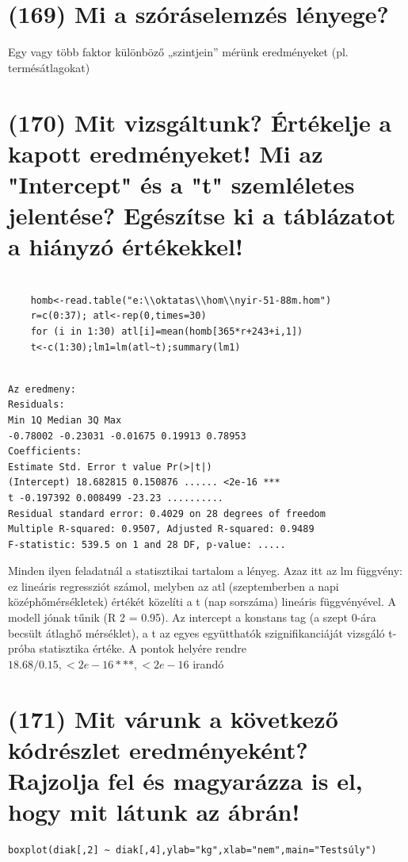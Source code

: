 \documentclass[12p]{article}
\begin{document}
\section{(169) Mi a szóráselemzés lényege?}
Egy vagy több faktor különböző „szintjein” mérünk eredményeket (pl. termésátlagokat)


\section{(170) Mit vizsgáltunk? Értékelje a kapott eredményeket! Mi az "Intercept" és a "t" szemléletes
jelentése? Egészítse ki a táblázatot a hiányzó értékekkel!}

\begin{verbatim}

	homb<-read.table("e:\\oktatas\\hom\\nyir-51-88m.hom")
	r=c(0:37); atl<-rep(0,times=30)
	for (i in 1:30) atl[i]=mean(homb[365*r+243+i,1])
	t<-c(1:30);lm1=lm(atl~t);summary(lm1)
	
\end{verbatim}
\begin{verbatim}
Az eredmeny:
Residuals:
Min 1Q Median 3Q Max
-0.78002 -0.23031 -0.01675 0.19913 0.78953
Coefficients:
Estimate Std. Error t value Pr(>|t|)
(Intercept) 18.682815 0.150876 ...... <2e-16 ***
t -0.197392 0.008499 -23.23 ..........
Residual standard error: 0.4029 on 28 degrees of freedom
Multiple R-squared: 0.9507, Adjusted R-squared: 0.9489
F-statistic: 539.5 on 1 and 28 DF, p-value: .....
\end{verbatim}

Minden ilyen feladatnál a statisztikai tartalom a lényeg. Azaz itt az lm függvény: ez
lineáris regressziót számol, melyben az atl (szeptemberben a napi középhőmérsékletek) értékét közelíti a t (nap sorszáma) lineáris függvényével. A modell jónak tűnik (R
2 = 0.95). Az
intercept a konstans tag (a szept 0-ára becsült átlaghő mérséklet), a t az egyes együtthatók
szignifikanciáját vizsgáló t-próba statisztika értéke. A pontok helyére rendre $18.68/0.15, < 2e - 16 ***,
< 2e - 16$ irandó


\section{(171) Mit várunk a következő kódrészlet eredményeként? Rajzolja fel és magyarázza is el, hogy
mit látunk az ábrán!}

\begin{verbatim}
boxplot(diak[,2] ~ diak[,4],ylab="kg",xlab="nem",main="Testsúly")
\end{verbatim}
\end{document}
